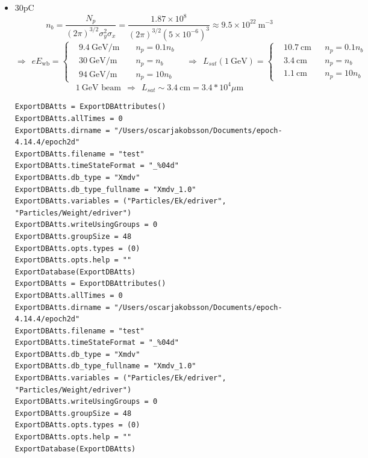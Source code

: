 \begin{itemize}
$$\begin{aligned}
&17 ~\text{GeV/m }&& n_p=0.1 n_b \\
&54 ~\text{GeV/m} && n_p=n_b\\
&172 ~\text{GeV/m} &&n_p=10 n_b
\end{aligned}\right.\quad\Rightarrow ~~L_{sat}(1 ~\text{GeV})=\left\{\begin{aligned}
&5.8 ~\text{cm}&& n_p=0.1 n_b \\
&1.9 ~\text{cm} && n_p=n_b\\
&0.6 ~\text{cm} &&n_p=10 n_b
\end{aligned}\right.$$
$$1 ~\text{GeV beam} ~~\Rightarrow ~~ L_{sat}\sim 2 ~\text{cm}=2*10^4 \mu \text{m} $$
\item  30pC $$n_b=\frac{N_p}{(2\pi)^{3/2} \sigma_y^2\sigma_x}=\frac{1.87\times 10^{8}}{(2\pi)^{3/2} (5\times 10^{-6})^3}\approx 9.5\times 10^{22}~ \text{m}^{-3} $$
$$\Rightarrow ~~eE_{\text{wb}}=\left\{\begin{aligned}
&9.4 ~\text{GeV/m }&& n_p=0.1 n_b \\
&30 ~\text{GeV/m} && n_p=n_b\\
&94 ~\text{GeV/m} &&n_p=10 n_b
\end{aligned}\right.\quad\Rightarrow ~~L_{sat}(1 ~\text{GeV})=\left\{\begin{aligned}
&10.7 ~\text{cm}&& n_p=0.1 n_b \\
&3.4 ~\text{cm} && n_p=n_b\\
&1.1 ~\text{cm} &&n_p=10 n_b
\end{aligned}\right.$$
$$1 ~\text{GeV beam} ~~\Rightarrow ~~ L_{sat}\sim 3.4 ~\text{cm}=3.4*10^4 \mu \text{m} $$



\clearpage
\begin{verbatim}
ExportDBAtts = ExportDBAttributes()
ExportDBAtts.allTimes = 0
ExportDBAtts.dirname = "/Users/oscarjakobsson/Documents/epoch-4.14.4/epoch2d"
ExportDBAtts.filename = "test"
ExportDBAtts.timeStateFormat = "_%04d"
ExportDBAtts.db_type = "Xmdv"
ExportDBAtts.db_type_fullname = "Xmdv_1.0"
ExportDBAtts.variables = ("Particles/Ek/edriver", "Particles/Weight/edriver")
ExportDBAtts.writeUsingGroups = 0
ExportDBAtts.groupSize = 48
ExportDBAtts.opts.types = (0)
ExportDBAtts.opts.help = ""
ExportDatabase(ExportDBAtts)
ExportDBAtts = ExportDBAttributes()
ExportDBAtts.allTimes = 0
ExportDBAtts.dirname = "/Users/oscarjakobsson/Documents/epoch-4.14.4/epoch2d"
ExportDBAtts.filename = "test"
ExportDBAtts.timeStateFormat = "_%04d"
ExportDBAtts.db_type = "Xmdv"
ExportDBAtts.db_type_fullname = "Xmdv_1.0"
ExportDBAtts.variables = ("Particles/Ek/edriver", "Particles/Weight/edriver")
ExportDBAtts.writeUsingGroups = 0
ExportDBAtts.groupSize = 48
ExportDBAtts.opts.types = (0)
ExportDBAtts.opts.help = ""
ExportDatabase(ExportDBAtts)


\end{verbatim}
\end{itemize}
